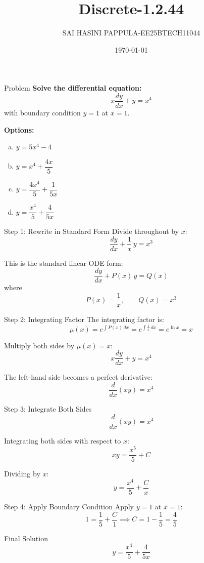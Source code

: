 \documentclass{beamer}
\title{Discrete-1.2.44}
\author{SAI HASINI PAPPULA-EE25BTECH11044}
\date{\today}
\begin{document}
\begin{frame}
\titlepage
\end{frame}

\begin{frame}{Problem}
\textbf{Solve the differential equation:}
\[
x\frac{dy}{dx} + y = x^4
\]
with boundary condition $y = 1$ at $x = 1$.

\vspace{1em}
\textbf{Options:}
\begin{enumerate}[(a)]
    \item $y = 5x^4 - 4$
    \item $y = x^4 + \dfrac{4x}{5}$
    \item $y = \dfrac{4x^4}{5} + \dfrac{1}{5x}$
    \item $y =\dfrac{x^4}{5} + \dfrac{4}{5x}$
\end{enumerate}
\end{frame}

\begin{frame}{Step 1: Rewrite in Standard Form}
Divide throughout by $x$:
\[
\frac{dy}{dx} + \frac{1}{x}\,y = x^3
\]

This is the standard linear ODE form:
\[
\frac{dy}{dx} + P(x)\,y = Q(x)
\]
where
\[
P(x) = \frac{1}{x}, \qquad Q(x) = x^3
\]
\end{frame}

\begin{frame}{Step 2: Integrating Factor}
The integrating factor is:
\[
\mu(x) = e^{\int P(x)\,dx} = e^{\int \frac{1}{x}\,dx} = e^{\ln x} = x
\]

Multiply both sides by $\mu(x) = x$:
\[
x\frac{dy}{dx} + y = x^4
\]

The left-hand side becomes a perfect derivative:
\[
\frac{d}{dx}\!\left(xy\right) = x^4
\]
\end{frame}

\begin{frame}{Step 3: Integrate Both Sides}
\[
\frac{d}{dx}(xy) = x^4
\]

Integrating both sides with respect to $x$:
\[
xy = \frac{x^5}{5} + C
\]

Dividing by $x$:
\[
y = \frac{x^4}{5} + \frac{C}{x}
\]
\end{frame}

\begin{frame}{Step 4: Apply Boundary Condition}
Apply $y = 1$ at $x = 1$:
\[
1 = \frac{1}{5} + \frac{C}{1} \implies C = 1 - \frac{1}{5} = \frac{4}{5}
\]

\vspace{0.5em}
\begin{block}{Final Solution}
\[
y = \frac{x^4}{5} + \frac{4}{5x}
\]
\end{block}
\end{frame}
\end{document}

